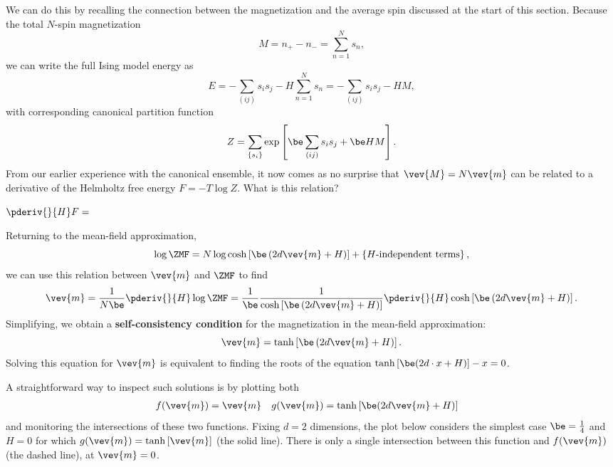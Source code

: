 We can do this by recalling the connection between the magnetization and the average spin discussed at the start of this section.
Because the total $N$-spin magnetization
\begin{equation*}
  M = n_+ - n_- = \sum_{n = 1}^N s_n,
\end{equation*}
we can write the full Ising model energy as
\begin{equation*}
  E = -\sum_{(ij)} s_i s_j - H \sum_{n = 1}^N s_n = -\sum_{(ij)} s_i s_j - H M,
\end{equation*}
with corresponding canonical partition function
\begin{equation*}
  Z = \sum_{\left\{s_i\right\}} \exp\left[\be \sum_{(ij)} s_i s_j + \be H M\right].
\end{equation*}
\newpage %
\noindent From our earlier experience with the canonical ensemble, it now comes as no surprise that $\vev{M} = N\vev{m}$ can be related to a derivative of the Helmholtz free energy $F = -T\log Z$.
What is this relation?
\begin{mdframed}
  $\displaystyle \pderiv{}{H} F = $ \\[100 pt]
\end{mdframed}

Returning to the mean-field approximation,
\begin{equation*}
  \log \ZMF = N\log \cosh\left[\be \left(2d\vev{m} + H\right)\right] + \left\{H\mbox{-independent terms}\right\},
\end{equation*}
we can use this relation between $\vev{m}$ and $\ZMF$ to find
\begin{equation*}
  \vev{m} = \frac{1}{N\be} \pderiv{}{H}\log \ZMF = \frac{1}{\be} \frac{1}{\cosh\left[\be \left(2d\vev{m} + H\right)\right]} \pderiv{}{H}\cosh\left[\be \left(2d\vev{m} + H\right)\right].
\end{equation*}
Simplifying, we obtain a \textbf{self-consistency condition} for the magnetization in the mean-field approximation:
\begin{equation}
  \label{eq:consistency}
  \vev{m} = \tanh\left[\be \left(2d\vev{m} + H\right)\right].
\end{equation}
Solving this equation for $\vev{m}$ is equivalent to finding the roots of the equation $\tanh\left[\be (2d\cdot x + H)\right] - x = 0$.

A straightforward way to inspect such solutions is by plotting both
\begin{align*}
  f(\vev{m}) & = \vev{m} &
  g(\vev{m}) & = \tanh\left[\be (2d\vev{m} + H)\right]
\end{align*}
and monitoring the intersections of these two functions.
Fixing $d = 2$ dimensions, the plot below considers the simplest case $\be = \frac{1}{4}$ and $H = 0$ for which $g(\vev{m}) = \tanh\left[\vev{m}\right]$ (the solid line).
There is only a single intersection between this function and $f(\vev{m})$ (the dashed line), at $\vev{m} = 0$.

